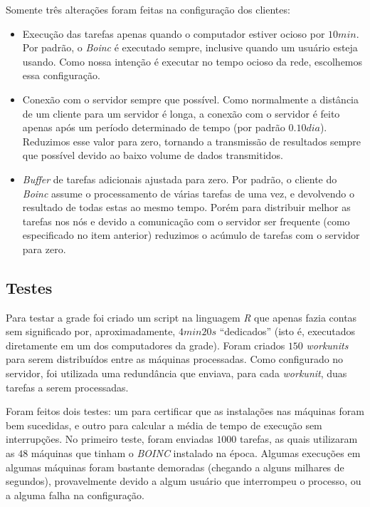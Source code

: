 Somente três alterações foram feitas na configuração dos clientes: 


\begin{itemize}
   \item Execução das tarefas apenas quando o computador estiver ocioso por $10min$. Por padrão, o \textit{Boinc} é 
executado sempre, inclusive quando um usuário esteja usando. Como nossa intenção é executar no tempo ocioso da rede, 
escolhemos essa configuração. 
   \item Conexão com o servidor sempre que possível. Como normalmente a distância de um cliente para um servidor é longa,
a conexão com o servidor é feito apenas após um período determinado de tempo (por padrão $0.10 dia$). Reduzimos 
esse valor para zero, tornando a transmissão de resultados sempre que possível devido ao baixo volume de dados transmitidos. 
   \item \emph{Buffer} de tarefas adicionais ajustada para zero. Por padrão, o cliente do \textit{Boinc} assume o processamento de várias
tarefas de uma vez, e devolvendo o resultado de todas estas ao mesmo tempo. Porém para distribuir melhor as
tarefas nos nós e devido a comunicação com o servidor ser frequente (como especificado no item anterior)
reduzimos o acúmulo de tarefas com o servidor para zero.
\end{itemize} 


\subsection{Testes}



Para testar a grade foi criado um script na linguagem \emph{R} que apenas fazia contas sem significado 
por, aproximadamente, $4min20s$ ``dedicados'' (isto é, executados diretamente em um dos computadores da grade). Foram criados 
$150$ \textit{workunits} para serem distribuídos entre as máquinas  processadas. Como
configurado no servidor, foi utilizada uma redundância que enviava, 
para cada \textit{workunit}, duas tarefas a serem processadas.

Foram feitos dois testes: um para certificar que as instalações nas máquinas foram bem sucedidas, e outro para calcular a média de tempo de execução sem interrupções. No primeiro teste, foram enviadas $1000$ tarefas, as quais utilizaram as $48$ máquinas que tinham o \textit{BOINC} instalado na época. Algumas execuções em algumas máquinas foram bastante demoradas (chegando a alguns milhares de segundos), provavelmente devido a algum usuário que interrompeu o processo, ou a alguma falha na configuração. 

